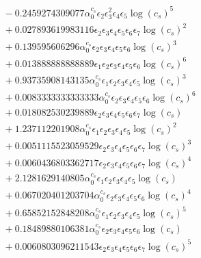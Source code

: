 \documentclass[10pt]{article}
\begin{document}
\begin{align*}
&{}  - 0.2459274309077 \alpha_{0}^{c_s} \epsilon_{2} \epsilon_{3}^{2} \epsilon_{4} \epsilon_{5} \log{\left(c_{s} \right)}^{5} \\
&{}  + 0.027893619983116 \epsilon_{2} \epsilon_{3} \epsilon_{4} \epsilon_{5} \epsilon_{6} \epsilon_{7} \log{\left(c_{s} \right)}^{2} \\
&{}  + 0.139595606296 \alpha_{0}^{c_s} \epsilon_{2} \epsilon_{3} \epsilon_{4} \epsilon_{5} \epsilon_{6} \log{\left(c_{s} \right)}^{3} \\
&{}  + 0.013888888888889 \epsilon_{1} \epsilon_{2} \epsilon_{3} \epsilon_{4} \epsilon_{5} \epsilon_{6} \log{\left(c_{s} \right)}^{6} \\
&{}  + 0.93735908143135 \alpha_{0}^{c_s} \epsilon_{1} \epsilon_{2} \epsilon_{3} \epsilon_{4} \epsilon_{5} \log{\left(c_{s} \right)}^{3} \\
&{}  + 0.0083333333333333 \alpha_{0}^{c_s} \epsilon_{2} \epsilon_{3} \epsilon_{4} \epsilon_{5} \epsilon_{6} \log{\left(c_{s} \right)}^{6} \\
&{}  + 0.018082530239889 \epsilon_{2} \epsilon_{3} \epsilon_{4} \epsilon_{5} \epsilon_{6} \epsilon_{7} \log{\left(c_{s} \right)} \\
&{}  + 1.237112201908 \alpha_{0}^{c_s} \epsilon_{1} \epsilon_{2} \epsilon_{3} \epsilon_{4} \epsilon_{5} \log{\left(c_{s} \right)}^{2} \\
&{}  + 0.0051115523059529 \epsilon_{2} \epsilon_{3} \epsilon_{4} \epsilon_{5} \epsilon_{6} \epsilon_{7} \log{\left(c_{s} \right)}^{3} \\
&{}  + 0.0060436803362717 \epsilon_{2} \epsilon_{3} \epsilon_{4} \epsilon_{5} \epsilon_{6} \epsilon_{7} \log{\left(c_{s} \right)}^{4} \\
&{}  + 2.1281629140805 \alpha_{0}^{c_s} \epsilon_{1} \epsilon_{2} \epsilon_{3} \epsilon_{4} \epsilon_{5} \log{\left(c_{s} \right)} \\
&{}  + 0.067020401203704 \alpha_{0}^{c_s} \epsilon_{2} \epsilon_{3} \epsilon_{4} \epsilon_{5} \epsilon_{6} \log{\left(c_{s} \right)}^{4} \\
&{}  + 0.65852152848208 \alpha_{0}^{c_s} \epsilon_{1} \epsilon_{2} \epsilon_{3} \epsilon_{4} \epsilon_{5} \log{\left(c_{s} \right)}^{5} \\
&{}  + 0.18489880106381 \alpha_{0}^{c_s} \epsilon_{2} \epsilon_{3} \epsilon_{4} \epsilon_{5} \epsilon_{6} \log{\left(c_{s} \right)} \\
&{}  + 0.0060803096211543 \epsilon_{2} \epsilon_{3} \epsilon_{4} \epsilon_{5} \epsilon_{6} \epsilon_{7} \log{\left(c_{s} \right)}^{5} \\

\end{align*}
\end{document}
